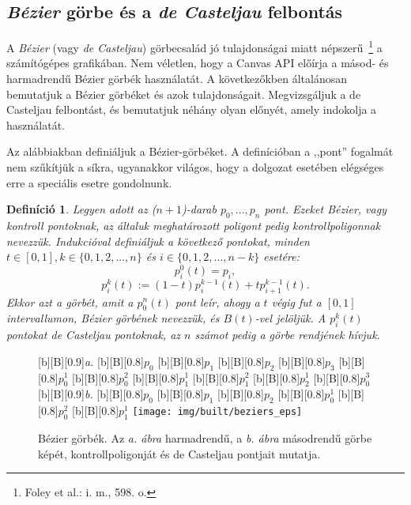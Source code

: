 \documentclass[12pt]{report}
\newtheorem{defi}[tét]{Definíció}
\theoremstyle{definition}
\begin{document}
    \subsection*{\emph{Bézier} görbe és a \emph{de Casteljau} felbontás}
    \label{Bézier görbe és a de Casteljau felbontás}

A \emph{Bézier} (vagy \emph{de Casteljau}) görbecsalád jó tulajdonságai miatt
népszerű~\footnote{Foley et al.: i. m., 598. o.} a számítógépes
grafikában. Nem véletlen, hogy a Canvas API előírja a másod- és harmadrendű
Bézier görbék használatát. A következőkben általánosan bemutatjuk a Bézier
görbéket és azok tulajdonságait. Megvizsgáljuk a de Casteljau felbontást, és
bemutatjuk néhány olyan előnyét, amely indokolja a használatát.

Az alábbiakban definiáljuk a Bézier-görbéket. A definícióban a ,,pont'' fogalmát
nem szűkítjük a síkra, ugyanakkor világos, hogy a dolgozat esetében elégséges
erre a speciális esetre gondolnunk.

\begin{defi}\label{Bézier}\cite[Kurusa]{Kurusa:1999:szamitogepes}
Legyen adott az ($n+1$)-darab $p_0,...,p_n$ pont. Ezeket Bézier, vagy kontroll
pontoknak, az általuk meghatározott poligont pedig kontrollpoligonnak nevezzük.
Indukcióval definiáljuk a következő pontokat, minden $t \in [0,1], k \in
\{{0,1,2,...,n\}}$ és $i \in \{{0,1,2,...,n-k\}}$ esetére:
\[p^0_i(t)=p_i,\]
\[p^k_i(t):=(1-t)p^{k-1}_i(t) + tp^{k-1}_{i+1}(t).\]
Ekkor azt a görbét, amit a $p^n_0(t)$ pont leír, ahogy a $t$ végig fut a $[0,1]$
intervallumon, Bézier görbének nevezzük, és $B(t)$-vel jelöljük. A $p^k_i(t)$
pontokat de Casteljau pontoknak, az $n$ számot pedig a görbe rendjének hívjuk.
\end{defi}

  \begin{figure}[!htb]
  [b][B][0.9]{\emph{a.}}
  [b][B][0.8]{\bf{$p_{0}$}}
  [b][B][0.8]{\bf{$p_{1}$}}
  [b][B][0.8]{\bf{$p_{2}$}}
  [b][B][0.8]{\bf{$p_{3}$}}
  [b][B][0.8]{\bf{$p_{0}^{1}$}}
  [b][B][0.8]{\bf{$p_{0}^{2}$}}
  [b][B][0.8]{\bf{$p_{1}^{1}$}}
  [b][B][0.8]{\bf{$p_{1}^{2}$}}
  [b][B][0.8]{\bf{$p_{2}^{1}$}}
  [b][B][0.8]{\bf{$p_{0}^{3}$}}
  [b][B][0.9]{\emph{b.}}
  [b][B][0.8]{\bf{$p_{0}$}}
  [b][B][0.8]{\bf{$p_{1}$}}
  [b][B][0.8]{\bf{$p_{2}$}}
  [b][B][0.8]{\bf{$p_{0}^{1}$}}
  [b][B][0.8]{\bf{$p_{0}^{2}$}}
  [b][B][0.8]{\bf{$p_{1}^{1}$}}
    \centering
    \texttt{[image: img/built/beziers\_eps]}
    \caption{\label{beziers} Bézier görbék. Az \emph{a. ábra} harmadrendű, a
    \emph{b. ábra} másodrendű görbe képét, kontrollpoligonját és de
    Casteljau pontjait mutatja.}
  \end{figure}
\end{document}
